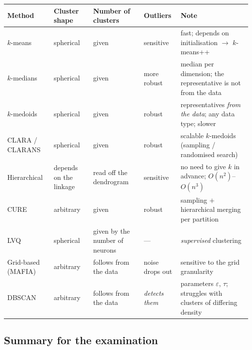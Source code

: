 \documentclass[11pt,a4paper]{article}
\theoremstyle{definition}
\begin{document}
\begin{center}
\small
\begin{tabular}{@{}p{2.6cm}p{2.3cm}p{2.4cm}p{2.2cm}p{5.0cm}@{}}
\toprule
\textbf{Method} & \textbf{Cluster shape} & \textbf{Number of clusters} & \textbf{Outliers}
  & \textbf{Note} \\
\midrule
$k$-means & spherical & given & sensitive & fast; depends on initialisation $\to$ $k$-means++ \\
$k$-medians & spherical & given & more robust & median per dimension; the representative is not
  from the data \\
$k$-medoids & spherical & given & robust & representatives \emph{from the data}; any data type;
  slower \\
CLARA / CLARANS & spherical & given & robust & scalable $k$-medoids (sampling / randomised
  search) \\
Hierarchical & depends on the linkage & read off the dendrogram & sensitive & no need to give $k$
  in advance; $O(n^2)$--$O(n^3)$ \\
CURE & arbitrary & given & robust & sampling $+$ hierarchical merging per partition \\
LVQ & spherical & given by the number of neurons & --- & \emph{supervised} clustering \\
Grid-based (MAFIA) & arbitrary & follows from the data & noise drops out & sensitive to the grid
  granularity \\
DBSCAN & arbitrary & follows from the data & \emph{detects them} & parameters $\varepsilon$,
  $\tau$; struggles with clusters of differing density \\
\bottomrule
\end{tabular}
\end{center}

\subsection{Summary for the examination}
\end{document}
